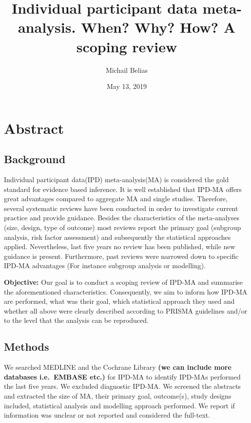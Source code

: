 \documentclass[]{article}
\title{Individual participant data meta-analysis. When? Why? How? A scoping
review}
\author{Michail Belias}
\date{May 13, 2019}
\begin{document}
\maketitle

\hypertarget{abstract}{%
\section{Abstract}\label{abstract}}

\hypertarget{background}{%
\subsection{Background}\label{background}}

Individual participant data(IPD) meta-analysis(MA) is considered the
gold standard for evidence based inference. It is well established that
IPD-MA offers great advantages compared to aggregate MA and single
studies. Therefore, several systematic reviews have been conducted in
order to investigate current practice and provide guidance. Besides the
characteristics of the meta-analyses (size, design, type of outcome)
most reviews report the primary goal (subgroup analysis, risk factor
assessment) and subsequently the statistical approaches applied.
Nevertheless, last five years no review has been published, while new
guidance is present. Furthermore, past reviews were narrowed down to
specific IPD-MA advantages (For instance subgroup analysis or
modelling).

\textbf{Objective:} Our goal is to conduct a scoping review of IPD-MA
and summarise the aforementioned characteristics. Consequently, we aim
to inform how IPD-MA are performed, what was their goal, which
statistical approach they used and whether all above were clearly
described according to PRISMA guidelines and/or to the level that the
analysis can be reproduced.

\hypertarget{methods}{%
\subsection{Methods}\label{methods}}

We searched MEDLINE and the Cochrane Library \textbf{(we can include
more databases i.e.~EMBASE etc.)} for IPD-MA to identify IPD-MAs
performed the last five years. We excluded diagnostic IPD-MA. We
screened the abstracts and extracted the size of MA, their primary goal,
outcome(s), study designs included, statistical analysis and modelling
approach performed. We report if information was unclear or not reported
and considered the full-text.
\end{document}
